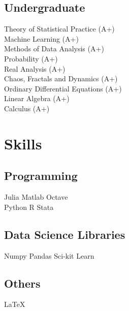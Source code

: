 \documentclass[letterpaper]{deedy-resume} %
\begin{document}
\begin{minipage}[t]{0.33\textwidth}
\sectionspace %


\subsection{Undergraduate}
Theory of Statistical Practice (A+)\\%
Machine Learning (A+) \\
Methods of Data Analysis (A+) \\
Probability (A+) \\
Real Analysis (A+)\\%
Chaos, Fractals and Dynamics (A+) \\
Ordinary Differential Equations (A+) \\
Linear Algebra (A+)\\
Calculus (A+)\\

\sectionspace %


\section{Skills}
\subsection{Programming}
Julia \textbullet{} Matlab \textbullet{} Octave \\
Python \textbullet{} R \textbullet{} Stata \\
\subsection{Data Science Libraries}
Numpy \textbullet{} Pandas \textbullet{} Sci-kit Learn \\
\subsection{Others}
\LaTeX

\sectionspace %


\end{minipage} %
\end{document}
